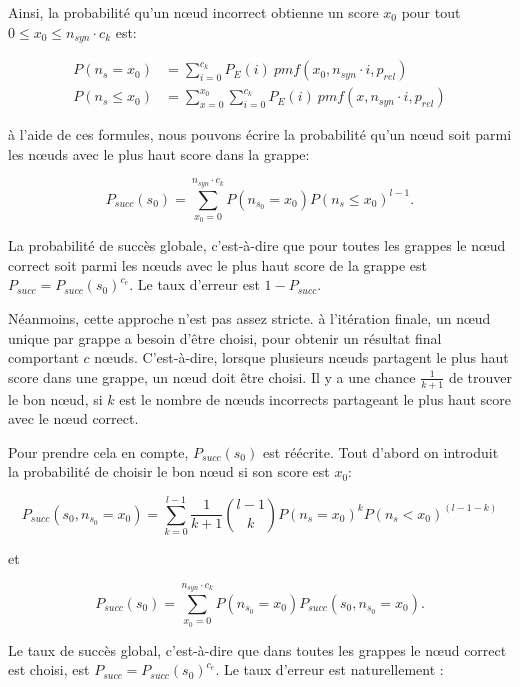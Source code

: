 \documentclass{gretsi}
\begin{document}
Ainsi, la probabilité qu'un nœud incorrect obtienne un score $x_0$ pour tout $ 0 \leq x_0 \leq n_{syn} \cdot c_k $ est:

\begin{equation}
\begin{split}
P(n_s=x_0) & = \sum_{i=0}^{c_k} P_E(i)\ pmf(x_0, n_{syn} \cdot i, p_{rel})\\
P(n_s\leq x_0) & = \sum_{x=0}^{x_0}\sum_{i=0}^{c_k} P_E(i)\ pmf(x, n_{syn}\cdot i, p_{rel})
\end{split}
\end{equation}

à l'aide de ces formules, nous pouvons écrire la probabilité qu'un nœud soit parmi les nœuds avec le plus haut score dans la grappe:

\begin{equation}
P_{succ}(s_0) = \sum_{x_0=0}^{n_{syn}\cdot c_k}P(n_{s_0}=x_0) P(n_s \leq x_0) ^ {l-1}.
\end{equation}

La probabilité de succès globale, c'est-à-dire que pour toutes les grappes le nœud correct soit parmi les nœuds avec le plus haut score de la grappe est $P_{succ} = P_{succ}(s_0)^{c_e}$. Le taux d'erreur est $1-P_{succ}$.

Néanmoins, cette approche n'est pas assez stricte. à l'itération finale, un nœud unique par grappe a besoin d'\^etre choisi, pour obtenir un résultat final comportant $c$ nœuds. C'est-à-dire, lorsque plusieurs nœuds partagent le plus haut score dans une grappe, un nœud doit \^etre choisi. Il y a une chance $\frac{1}{k+1}$ de trouver le bon nœud, si $k$ est le nombre de nœuds incorrects partageant le plus haut score avec le nœud correct.

Pour prendre cela en compte, $P_{succ}(s_0)$ est réécrite. Tout d'abord on introduit la probabilité de choisir le bon nœud si son score est $x_0$:

\begin{equation}
P_{succ}(s_0, n_{s_0}=x_0) = \sum_{k=0}^{l-1}\frac{1}{k+1} \binom{l-1}{k} P(n_s = x_0)^k P(n_s < x_0)^{(l-1-k)}
\end{equation}

et

\begin{equation}
P_{succ}(s_0) = \sum_{x_0=0}^{n_{syn}\cdot c_k}P(n_{s_0}=x_0) P_{succ}(s_0, n_{s_0}=x_0).
\end{equation}

Le taux de succès global, c'est-à-dire que dans toutes les grappes le nœud correct est choisi, est $P_{succ} = P_{succ}(s_0)^{c_e}$. Le taux d'erreur est naturellement :
\end{document}
